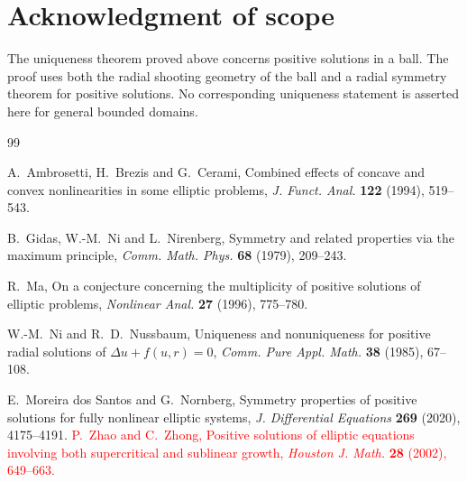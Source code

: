 \documentclass[11pt]{article}
\theoremstyle{definition}
\begin{document}


\section*{Acknowledgment of scope}

The uniqueness theorem proved above concerns positive solutions in a
ball. The proof uses both the radial shooting geometry of the ball and
a radial symmetry theorem for positive solutions. No corresponding
uniqueness statement is asserted here for general bounded domains.

\begin{thebibliography}{99}

A.~Ambrosetti, H.~Brezis and G.~Cerami,
\newblock Combined effects of concave and convex nonlinearities in some elliptic problems,
\newblock \emph{J. Funct. Anal.} \textbf{122} (1994), 519--543.

B.~Gidas, W.-M.~Ni and L.~Nirenberg,
\newblock Symmetry and related properties via the maximum principle,
\newblock \emph{Comm. Math. Phys.} \textbf{68} (1979), 209--243.

R.~Ma,
\newblock On a conjecture concerning the multiplicity of positive solutions of elliptic problems,
\newblock \emph{Nonlinear Anal.} \textbf{27} (1996), 775--780.

W.-M.~Ni and R.~D.~Nussbaum,
\newblock Uniqueness and nonuniqueness for positive radial solutions of
$\Delta u+f(u,r)=0$,
\newblock \emph{Comm. Pure Appl. Math.} \textbf{38} (1985), 67--108.

E.~Moreira dos Santos and G.~Nornberg,
\newblock Symmetry properties of positive solutions for fully nonlinear elliptic systems,
\newblock \emph{J. Differential Equations} \textbf{269} (2020), 4175--4191.
\textcolor{red}{
P.~Zhao and C.~Zhong,
\newblock Positive solutions of elliptic equations involving both
supercritical and sublinear growth,
\newblock \emph{Houston J. Math.} \textbf{28} (2002), 649--663.
}

\end{thebibliography}
\end{document}
